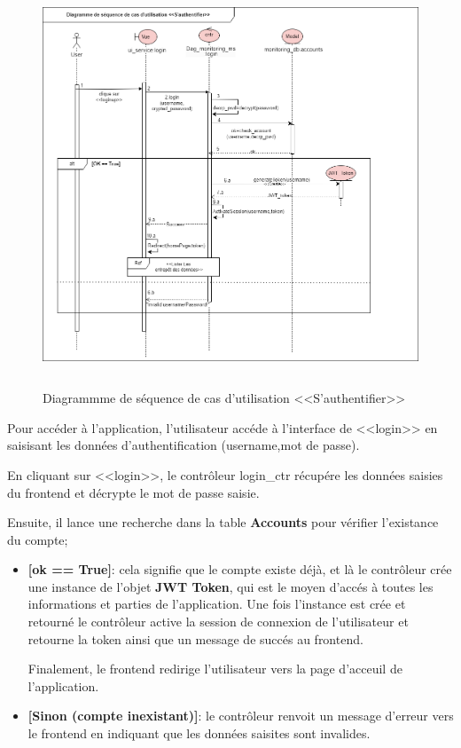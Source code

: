     \begin{figure}[H]
        \centering
        \includegraphics[width =1\linewidth, height=12cm]{img/conception/login.png}
        \caption{Diagrammme de séquence de cas d'utilisation <<S'authentifier>> }
        \label{fig:seq4}
    \end{figure}
    \par Pour accéder à l'application, l'utilisateur accéde à l'interface de <<login>> en saisisant les données d'authentification (username,mot de passe).
    \par En cliquant sur <<login>>, le contrôleur login\_ctr récupére les données saisies du frontend et décrypte le mot de passe saisie. 
    \par Ensuite, il lance une recherche dans la table \textbf{Accounts} pour vérifier l'existance du compte; 
    \begin{itemize}
        \item \textbf{[ok == True]}: cela signifie que le compte existe déjà, et là le contrôleur crée une instance de l'objet \textbf{JWT Token}, qui est le moyen d'accés à toutes les informations et parties de l'application.
         Une fois l'instance est crée et retourné le contrôleur active la session de connexion de l'utilisateur et retourne la token ainsi que un message de succés au frontend.
        \par Finalement, le frontend redirige l'utilisateur vers la page d'acceuil de l'application.
        \item \textbf{[Sinon (compte inexistant)]}: le contrôleur renvoit un message d'erreur vers le frontend en indiquant que les données saisites sont invalides.
    \end{itemize}
